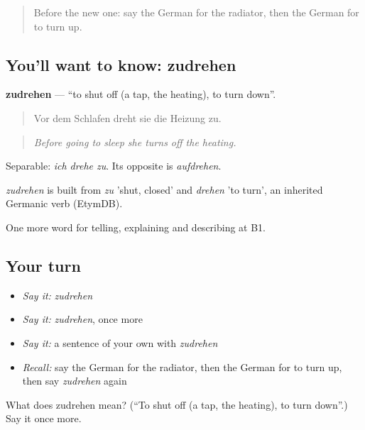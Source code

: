 \label{lesson:GE-C427-zudrehen}



\begin{quote}
Before the new one: say the German for the radiator, then the German for to turn up.
\end{quote}

\subsection*{You'll want to know: zudrehen}
\textbf{zudrehen} — \textquotedblleft{}to shut off (a tap, the heating), to turn down\textquotedblright{}.

\begin{quote}
Vor dem Schlafen dreht sie die Heizung zu.
\end{quote}

\begin{quote}
\emph{Before going to sleep she turns off the heating.}
\end{quote}

Separable: \emph{ich drehe zu}. Its opposite is \emph{aufdrehen}.

\begin{cousinweb}
\emph{zudrehen} is built from \emph{zu} 'shut, closed' and \emph{drehen} 'to turn', an inherited Germanic verb (EtymDB).
\end{cousinweb}

\begin{grammarlens}[title={What you've built}]
One more word for telling, explaining and describing at B1.
\end{grammarlens}

\subsection*{Your turn}
\begin{itemize}
\raggedright
  \item \emph{Say it:} \emph{zudrehen}
  \item \emph{Say it:} \emph{zudrehen}, once more
  \item \emph{Say it:} a sentence of your own with \emph{zudrehen}
  \item \emph{Recall:} say the German for the radiator, then the German for to turn up, then say \emph{zudrehen} again
\end{itemize}

\begin{tcolorbox}[breakable,colback=teal!4,colframe=teal!35!black,title={Before you move on}]
What does zudrehen mean? (\textquotedblleft{}To shut off (a tap, the heating), to turn down\textquotedblright{}.) Say it once more.
\end{tcolorbox}
